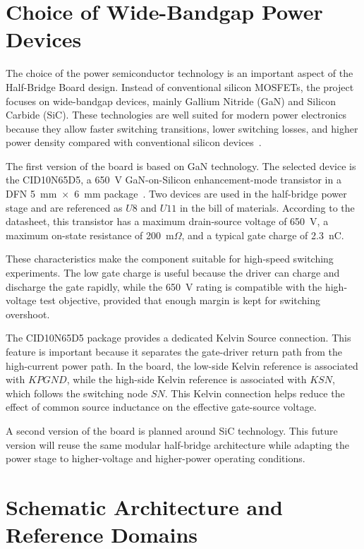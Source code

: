 \section{Choice of Wide-Bandgap Power Devices}

The choice of the power semiconductor technology is an important aspect of the
Half-Bridge Board design. Instead of conventional silicon MOSFETs, the project
focuses on wide-bandgap devices, mainly Gallium Nitride (GaN) and Silicon
Carbide (SiC). These technologies are well suited for modern power electronics
because they allow faster switching transitions, lower switching losses, and
higher power density compared with conventional silicon
devices~\cite{buffolo2024gan_sic_review}.

The first version of the board is based on GaN technology. The selected device
is the CID10N65D5, a 650~V GaN-on-Silicon enhancement-mode transistor in a DFN
5~mm~\(\times\)~6~mm package~\cite{cid10n65d5_datasheet}. Two devices are used in
the half-bridge power stage and are referenced as \(U8\) and \(U11\) in the bill
of materials. According to the datasheet, this transistor has a maximum
drain-source voltage of 650~V, a maximum on-state resistance of
200~m\(\Omega\), and a typical gate charge of 2.3~nC.

These characteristics make the component suitable for high-speed switching
experiments. The low gate charge is useful because the driver can charge and
discharge the gate rapidly, while the 650~V rating is compatible with the
high-voltage test objective, provided that enough margin is kept for switching
overshoot.

The CID10N65D5 package provides a dedicated Kelvin Source connection. This
feature is important because it separates the gate-driver return path from the
high-current power path. In the board, the low-side Kelvin reference is
associated with \(KPGND\), while the high-side Kelvin reference is associated
with \(KSN\), which follows the switching node \(SN\). This Kelvin connection
helps reduce the effect of common source inductance on the effective
gate-source voltage.

A second version of the board is planned around SiC technology. This future
version will reuse the same modular half-bridge architecture while adapting the
power stage to higher-voltage and higher-power operating conditions.


\newpage
\section{Schematic Architecture and Reference Domains}

